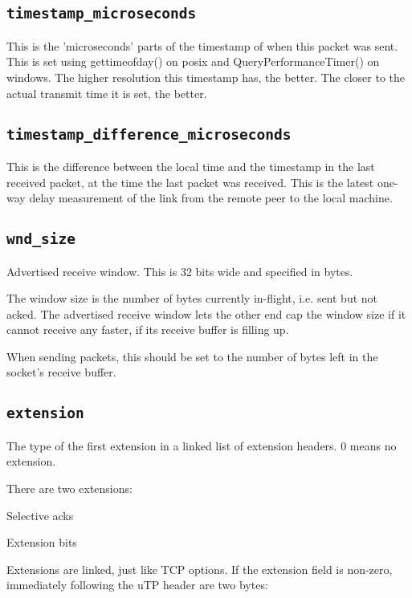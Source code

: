 \documentclass[11pt,a4paper,oneside,draft]{article}
\begin{document}
{\subsection {{\tt timestamp\_microseconds}}}

This is the 'microseconds' parts of the timestamp of when this packet was sent. This is set using gettimeofday() on posix and QueryPerformanceTimer() on windows. The higher resolution this timestamp has, the better. The closer to the actual transmit time it is set, the better.

{\subsection {{\tt timestamp\_difference\_microseconds}}}

This is the difference between the local time and the timestamp in the last received packet, at the time the last packet was received. This is the latest one-way delay measurement of the link from the remote peer to the local machine.

{\subsection {{\tt wnd\_size}}}

Advertised receive window. This is 32 bits wide and specified in bytes.

The window size is the number of bytes currently in-flight, i.e. sent but not acked. The advertised receive window lets the other end cap the window size if it cannot receive any faster, if its receive buffer is filling up.

When sending packets, this should be set to the number of bytes left in the socket's receive buffer.

{\subsection {{\tt extension}}}

The type of the first extension in a linked list of extension headers. 0 means no extension.

There are two extensions:
{\begin{enumerate}
  {\item Selective acks}
  {\item Extension bits}
\end{enumerate}}

Extensions are linked, just like TCP options. If the extension field is non-zero, immediately following the uTP header are two bytes:
\end{document}

